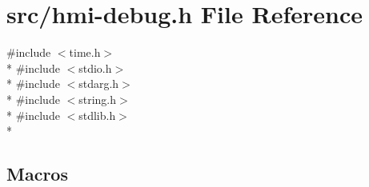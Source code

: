 \hypertarget{src_2hmi-debug_8h}{}\section{src/hmi-\/debug.h File Reference}
\label{src_2hmi-debug_8h}
{\ttfamily \#include $<$time.\+h$>$}\\*
{\ttfamily \#include $<$stdio.\+h$>$}\\*
{\ttfamily \#include $<$stdarg.\+h$>$}\\*
{\ttfamily \#include $<$string.\+h$>$}\\*
{\ttfamily \#include $<$stdlib.\+h$>$}\\*
\subsection*{Macros}
